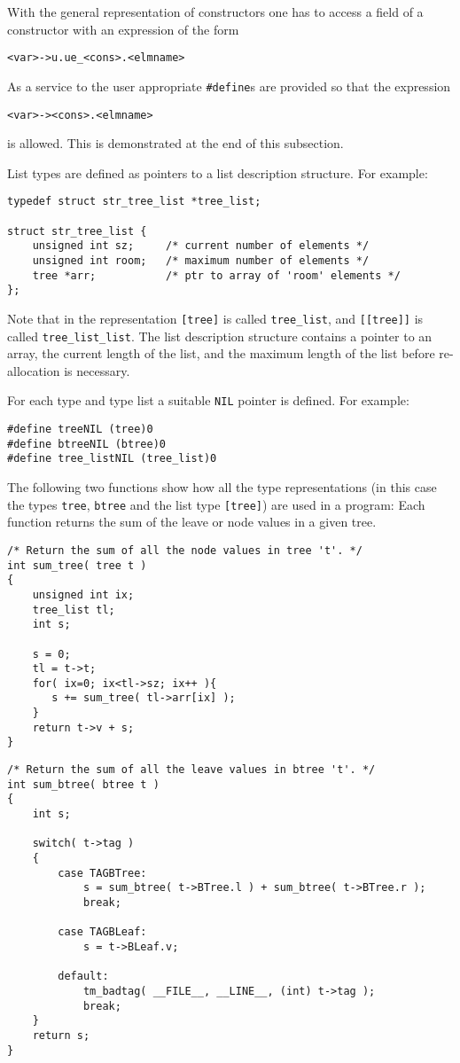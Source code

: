\par
With the general representation of constructors
one has to access a field of a constructor with an
expression of the form
\begin{verbatim}
<var>->u.ue_<cons>.<elmname>
\end{verbatim}
As a service to the user appropriate {\tt \#define}s are provided
so that the expression
\begin{verbatim}
<var>-><cons>.<elmname>
\end{verbatim}
is allowed.
This is demonstrated at the end of this subsection.
\par
List types are defined as pointers to a list description structure.
For example:
\begin{verbatim}
typedef struct str_tree_list *tree_list;

struct str_tree_list {
    unsigned int sz;     /* current number of elements */
    unsigned int room;   /* maximum number of elements */
    tree *arr;           /* ptr to array of 'room' elements */
};
\end{verbatim}
Note that in the {\C} representation \verb+[tree]+ is called
\verb+tree_list+, and \verb+[[tree]]+ is called \verb+tree_list_list+.
The list description structure contains a pointer to an array,
the current length of the list,
and the maximum length of the list before re-allocation is necessary.
\par
For each type and type list a suitable {\tt NIL} pointer is defined.
For example:
\begin{verbatim}
#define treeNIL (tree)0
#define btreeNIL (btree)0
#define tree_listNIL (tree_list)0
\end{verbatim}
The following two functions show how all the type representations
(in this case the types {\tt tree}, {\tt btree} and the list type
\verb+[tree]+)
are used in a program:
Each function returns the sum of the leave or node values in a given
tree.
\begin{verbatim}
/* Return the sum of all the node values in tree 't'. */
int sum_tree( tree t )
{
    unsigned int ix;
    tree_list tl;
    int s;

    s = 0;
    tl = t->t;
    for( ix=0; ix<tl->sz; ix++ ){
       s += sum_tree( tl->arr[ix] );
    }
    return t->v + s;
}
\end{verbatim}

\begin{verbatim}
/* Return the sum of all the leave values in btree 't'. */
int sum_btree( btree t )
{
    int s;

    switch( t->tag )
    {
        case TAGBTree:
            s = sum_btree( t->BTree.l ) + sum_btree( t->BTree.r );
            break;

        case TAGBLeaf:
            s = t->BLeaf.v;

        default:
            tm_badtag( __FILE__, __LINE__, (int) t->tag );
            break;
    }
    return s;
}
\end{verbatim}
